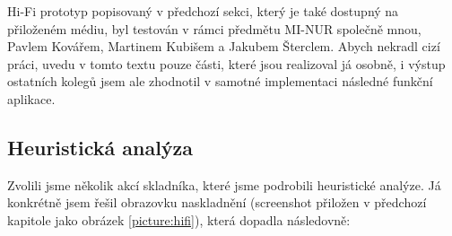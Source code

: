 Hi-Fi prototyp popisovaný v předchozí sekci, který je také dostupný na přiloženém médiu, byl testován v rámci předmětu MI-NUR společně mnou, Pavlem Kovářem, Martinem Kubišem a Jakubem Šterclem. Abych nekradl cizí práci, uvedu v tomto textu pouze části, které jsou realizoval já osobně, i výstup ostatních kolegů jsem ale zhodnotil v samotné implementaci následné funkční aplikace.


\subsection{Heuristická analýza}

Zvolili jsme několik akcí skladníka, které jsme podrobili heuristické analýze. Já konkrétně jsem řešil obrazovku naskladnění (screenshot přiložen v předchozí kapitole jako obrázek \ref{picture:hifi}), která dopadla následovně:

